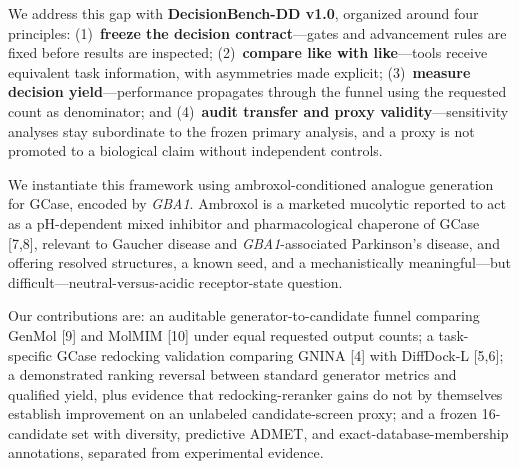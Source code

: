 \documentclass{article}
\begin{document}
We address this gap with \textbf{DecisionBench-DD v1.0}, organized around four principles: (1)~\textbf{freeze the decision contract}---gates and advancement rules are fixed before results are inspected; (2)~\textbf{compare like with like}---tools receive equivalent task information, with asymmetries made explicit; (3)~\textbf{measure decision yield}---performance propagates through the funnel using the requested count as denominator; and (4)~\textbf{audit transfer and proxy validity}---sensitivity analyses stay subordinate to the frozen primary analysis, and a proxy is not promoted to a biological claim without independent controls.

We instantiate this framework using ambroxol-conditioned analogue generation for GCase, encoded by \textit{GBA1}. Ambroxol is a marketed mucolytic reported to act as a pH-dependent mixed inhibitor and pharmacological chaperone of GCase [7,8], relevant to Gaucher disease and \textit{GBA1}-associated Parkinson's disease, and offering resolved structures, a known seed, and a mechanistically meaningful---but difficult---neutral-versus-acidic receptor-state question.

Our contributions are: an auditable generator-to-candidate funnel comparing GenMol [9] and MolMIM [10] under equal requested output counts; a task-specific GCase redocking validation comparing GNINA [4] with DiffDock-L [5,6]; a demonstrated ranking reversal between standard generator metrics and qualified yield, plus evidence that redocking-reranker gains do not by themselves establish improvement on an unlabeled candidate-screen proxy; and a frozen 16-candidate set with diversity, predictive ADMET, and exact-database-membership annotations, separated from experimental evidence.
\end{document}
